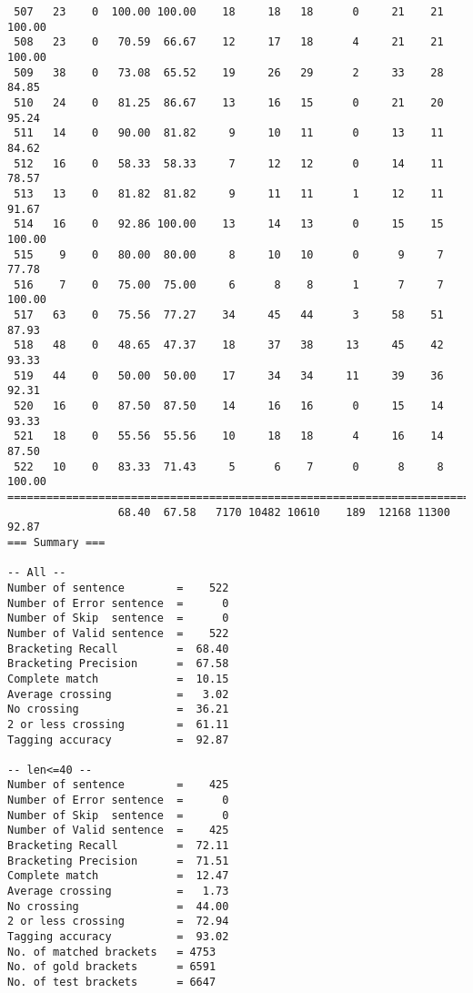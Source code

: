 \begin{verbatim}
 507   23    0  100.00 100.00    18     18   18      0     21    21   100.00
 508   23    0   70.59  66.67    12     17   18      4     21    21   100.00
 509   38    0   73.08  65.52    19     26   29      2     33    28    84.85
 510   24    0   81.25  86.67    13     16   15      0     21    20    95.24
 511   14    0   90.00  81.82     9     10   11      0     13    11    84.62
 512   16    0   58.33  58.33     7     12   12      0     14    11    78.57
 513   13    0   81.82  81.82     9     11   11      1     12    11    91.67
 514   16    0   92.86 100.00    13     14   13      0     15    15   100.00
 515    9    0   80.00  80.00     8     10   10      0      9     7    77.78
 516    7    0   75.00  75.00     6      8    8      1      7     7   100.00
 517   63    0   75.56  77.27    34     45   44      3     58    51    87.93
 518   48    0   48.65  47.37    18     37   38     13     45    42    93.33
 519   44    0   50.00  50.00    17     34   34     11     39    36    92.31
 520   16    0   87.50  87.50    14     16   16      0     15    14    93.33
 521   18    0   55.56  55.56    10     18   18      4     16    14    87.50
 522   10    0   83.33  71.43     5      6    7      0      8     8   100.00
============================================================================
                 68.40  67.58   7170 10482 10610    189  12168 11300    92.87
=== Summary ===

-- All --
Number of sentence        =    522
Number of Error sentence  =      0
Number of Skip  sentence  =      0
Number of Valid sentence  =    522
Bracketing Recall         =  68.40
Bracketing Precision      =  67.58
Complete match            =  10.15
Average crossing          =   3.02
No crossing               =  36.21
2 or less crossing        =  61.11
Tagging accuracy          =  92.87

-- len<=40 --
Number of sentence        =    425
Number of Error sentence  =      0
Number of Skip  sentence  =      0
Number of Valid sentence  =    425
Bracketing Recall         =  72.11
Bracketing Precision      =  71.51
Complete match            =  12.47
Average crossing          =   1.73
No crossing               =  44.00
2 or less crossing        =  72.94
Tagging accuracy          =  93.02
No. of matched brackets   = 4753
No. of gold brackets      = 6591
No. of test brackets      = 6647

\end{verbatim}

\normalsize

